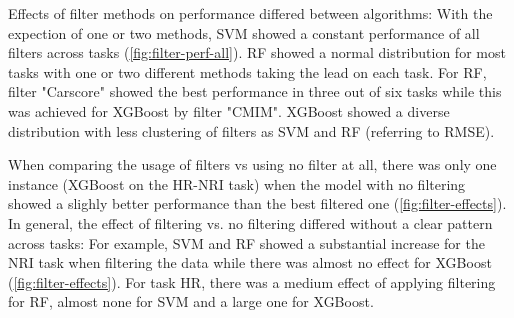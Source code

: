 \documentclass[letterpaper, journal]{IEEEtran}
\begin{document}
Effects of filter methods on performance differed between algorithms:
With the expection of one or two methods, SVM showed a constant performance of all filters across tasks (\autoref{fig:filter-perf-all}).
RF showed a normal distribution for most tasks with one or two different methods taking the lead on each task.
For RF, filter "Carscore" showed the best performance in three out of six tasks while this was achieved for XGBoost by filter "CMIM".
XGBoost showed a diverse distribution with less clustering of filters as SVM and RF (referring to RMSE).

When comparing the usage of filters vs using no filter at all, there was only one instance (XGBoost on the HR-NRI task) when the model with no filtering showed a slighly better performance than the best filtered one (\autoref{fig:filter-effects}).
In general, the effect of filtering vs. no filtering differed without a clear pattern across tasks: For example, SVM and RF showed a substantial increase for the NRI task when filtering the data while there was almost no effect for XGBoost (\autoref{fig:filter-effects}).
For task HR, there was a medium effect of applying filtering for RF, almost none for SVM and a large one for XGBoost.




\end{document}
